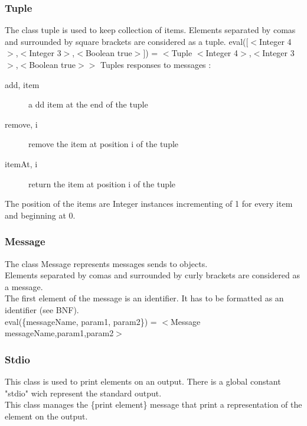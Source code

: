 \documentclass{eplDoc}
\begin{document}
\subsubsection{Tuple}
The class tuple is used to keep collection of items.
Elements separated by comas and surrounded by square brackets are considered as a tuple.
eval([$<$Integer 4$>$,$<$Integer 3$>$,$<$Boolean true$>$]) = $<$Tuple $<$Integer 4$>$,$<$Integer 3$>$,$<$Boolean true$>$$>$
Tuples responses to messages :
\begin{description}
    \item[add, item] a dd item at the end of the tuple
    \item[remove, i] remove the item at position i of the tuple
    \item[itemAt, i] return the item at position i of the tuple
\end{description}
The position of the items are Integer instances incrementing of 1 for every item and beginning at 0.\\



\subsubsection{Message}
The class Message represents messages sends to objects.\\
Elements separated by comas and surrounded by curly brackets are considered as a message.\\
The first element of the message is an identifier.  It has to be formatted as an identifier (see BNF).\\
eval(\{messageName, param1, param2\}) = $<$Message messageName,param1,param2$>$


\subsubsection{Stdio}
This class is used to print elements on an output.  There is a global constant "stdio" wich represent the standard output.  \\
This class manages the \{print element\} message that print a representation of the element on the output.  
\end{document}
